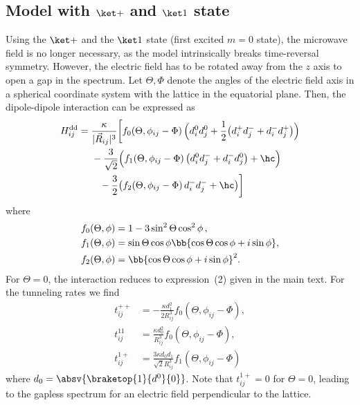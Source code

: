 \subsection{Model with \texorpdfstring{$\ketp$}{+} and \texorpdfstring{$\keto$}{1} state}
Using the $\ketp$ and the $\keto$ state (first excited $m=0$ state), the microwave field is no longer necessary, as the model intrinsically breaks time-reversal symmetry. However, the electric field has to be rotated away from the $z$ axis to open a gap in the spectrum. Let $\Theta, \Phi$ denote the angles of the electric field axis in a spherical coordinate system with the lattice in the equatorial plane.
Then, the dipole-dipole interaction can be expressed as
\begin{align}
    H^\text{dd}_{ij} &= \frac{\kappa}{|\vec{R}_{ij}|^3} \bigg[ f_0(\Theta, \phi_{ij} - \Phi)\, \Big( d^0_i d^0_j + \frac{1}{2}\big(d^+_i d^-_j + d^-_i d^+_j\big) \Big) \nonumber \\
                     &\hspace{1.38em} -\frac{3}{\sqrt{2}} \Big( f_1(\Theta, \phi_{ij} - \Phi) \, \big(d^0_i d^-_j + d^-_i d^0_j\big) + \hc \Big)\nonumber\\
                     &\hspace{2.2em} -\frac{3}{2} \big( f_2(\Theta, \phi_{ij} - \Phi) \, d^-_i d^-_j + \hc \big ) \bigg]
\end{align}
where
\begin{align}
    f_0(\Theta, \phi) &= 1-3\sin^2 \Theta \cos^2 \phi\, , \nonumber \\
    f_1(\Theta, \phi) &= \sin \Theta \cos \phi \bb{\cos \Theta \cos \phi + i \sin \phi} , \nonumber \\
    f_2(\Theta, \phi) &= \bb{\cos\Theta \cos\phi + i \sin \phi}^2 .
\end{align}
For $\Theta=0$, the interaction reduces to expression~(2) given in the main text.
For the tunneling rates we find
\begin{align}
    t^{++}_{ij} &= -\frac{\kappa d_{1}^2}{2R_{ij}^3} f_0(\Theta, \phi_{ij} - \Phi), \nonumber \\
    t^{11}_{ij} &= \frac{\kappa d_{0}^2}{R_{ij}^3} f_0(\Theta, \phi_{ij} - \Phi), \nonumber \\
    t^{1+}_{ij} &= \frac{3\kappa d_{0}d_{1}}{\sqrt{2}R_{ij}^3} f_1(\Theta, \phi_{ij} - \Phi)
\end{align}
where $d_0=\absv{\braketop{1}{d^0}{0}}$. Note that $t^{1+}_{ij}=0$ for $\Theta=0$, leading to the gapless spectrum for an electric field perpendicular to the lattice.

